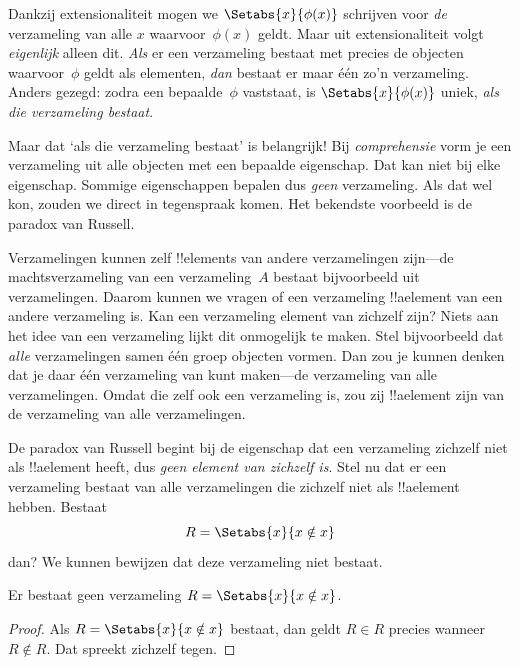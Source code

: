 \documentclass[../../../include/open-logic-section]{subfiles}
\begin{document}

Dankzij extensionaliteit mogen we $\Setabs{x}{\phi(x)}$ schrijven voor
\emph{de} verzameling van alle $x$ waarvoor~$\phi(x)$ geldt. Maar uit
extensionaliteit volgt \emph{eigenlijk} alleen dit. \emph{Als} er een
verzameling bestaat met precies de objecten waarvoor~$\phi$ geldt als
elementen, \emph{dan} bestaat er maar één zo'n verzameling. Anders
gezegd: zodra een bepaalde~$\phi$ vaststaat, is
$\Setabs{x}{\phi(x)}$ uniek, \emph{als die verzameling bestaat}.

Maar dat ‘als die verzameling bestaat’ is belangrijk!{} Bij
\emph{comprehensie} vorm je een verzameling uit alle objecten met een
bepaalde eigenschap. Dat kan niet bij elke eigenschap. Sommige
eigenschappen bepalen dus \emph{geen} verzameling. Als dat wel kon,
zouden we direct in tegenspraak komen. Het bekendste voorbeeld is de
paradox van Russell.

Verzamelingen kunnen zelf !!{element}s van andere verzamelingen
zijn---de machtsverzameling van een verzameling~$A$ bestaat
bijvoorbeeld uit verzamelingen. Daarom kunnen we vragen of een
verzameling !!a{element} van een andere verzameling is. Kan een
verzameling element van zichzelf zijn? Niets aan het idee van een
verzameling lijkt dit onmogelijk te maken. Stel bijvoorbeeld dat
\emph{alle} verzamelingen samen één groep objecten vormen. Dan zou je
kunnen denken dat je daar één verzameling van kunt maken---de
verzameling van alle verzamelingen. Omdat die zelf ook een verzameling
is, zou zij !!a{element} zijn van de verzameling van alle
verzamelingen.

De paradox van Russell begint bij de eigenschap dat een verzameling
zichzelf niet als !!a{element} heeft, dus \emph{geen element van
zichzelf is}. Stel nu dat er een verzameling bestaat van alle
verzamelingen die zichzelf niet als !!a{element} hebben. Bestaat
\[
R = \Setabs{x}{x \notin x}
\]
dan? We kunnen bewijzen dat deze verzameling niet bestaat.

\begin{thm}
	Er bestaat geen verzameling $R = \Setabs{x}{x \notin x}$.
\end{thm}

\begin{proof}
Als $R = \Setabs{x}{x \notin x}$ bestaat, dan geldt
$R \in R$ precies wanneer $R \notin R$. Dat spreekt zichzelf tegen.
\end{proof}
\end{document}
